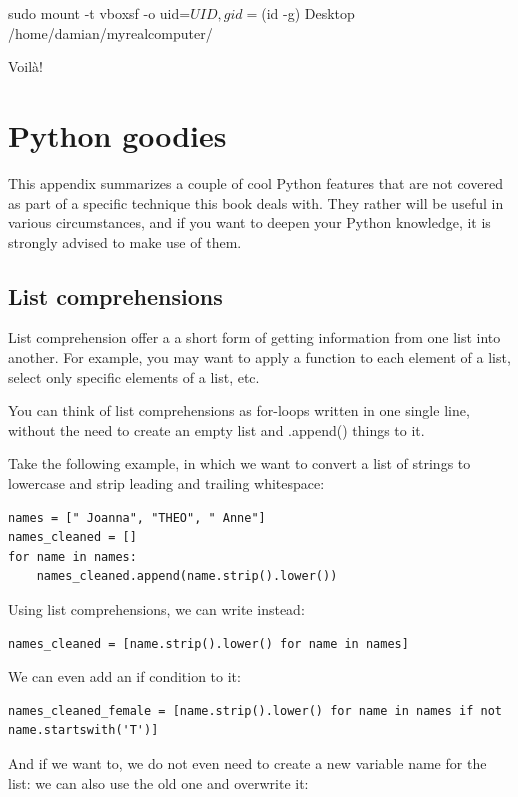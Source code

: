 \documentclass[a4paper,12pt]{book}
\begin{document}
\begin{appendices}
\begin{lstlistingbash}
sudo mount -t vboxsf -o uid=$UID,gid=$(id -g) Desktop /home/damian/myrealcomputer/
\end{lstlistingbash}

Voil\`a!



\chapter{Python goodies}
\label{chap:pythongoodies}
This appendix summarizes a couple of cool Python features that are not covered as part of a specific technique this book deals with.
They rather will be useful in various circumstances, and if you want to deepen your Python knowledge, it is strongly advised to make use of them.


\section{List comprehensions}
\label{sec:listcomprehensions}
List comprehension offer a a short form of getting information from one list into another.
For example, you may want to apply a function to each element of a list, select only specific elements of a list, etc.

You can think of list comprehensions as for-loops written in one single line, without the need to create an empty list and .append() things to it.

Take the following example, in which we want to convert a list of strings to lowercase and strip leading and trailing whitespace:

\begin{lstlisting}
names = [" Joanna", "THEO", " Anne"]
names_cleaned = []
for name in names:
    names_cleaned.append(name.strip().lower())
\end{lstlisting}

Using list comprehensions, we can write instead:
\begin{lstlisting}
names_cleaned = [name.strip().lower() for name in names]
\end{lstlisting}

We can even add an if condition to it:

\begin{lstlisting}
names_cleaned_female = [name.strip().lower() for name in names if not name.startswith('T')]
\end{lstlisting}

And if we want to, we do not even need to create a new variable name for the list: we can also use the old one and overwrite it:


\end{appendices}
\end{document}
